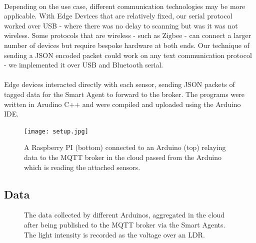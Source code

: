 \paragraph{}
Depending on the use case, different communication technologies may be more applicable. With Edge Devices that are relatively fixed, our serial protocol worked over USB - where there was no delay to scanning but was it was not wireless. Some protocols that are wireless - such as Zigbee - can connect a larger number of devices but require bespoke hardware at both ends. Our technique of sending a JSON encoded packet could work on any text communication protocol - we implemented it over USB and Bluetooth serial.

\paragraph{}
Edge devices interacted directly with each sensor, sending JSON packets of tagged data for the Smart Agent to forward to the broker. The programs were written in Arudino C++ and were compiled and uploaded using the Arduino IDE.


\begin{figure}
    \centering
    \texttt{[image: setup.jpg]}
    \caption{A Raspberry PI (bottom) connected to an Arduino (top) relaying data to the MQTT broker in the cloud passed from the Arduino which is reading the attached sensors.}
    \label{fig:setup}
\end{figure}


\subsection{Data}

\begin{figure}
    \centering
    \caption{The data collected by different Arduinos, aggregated in the cloud after being published to the MQTT broker via the Smart Agents. The light intensity is recorded as the voltage over an LDR.}
    \label{fig:graph}
\end{figure}

